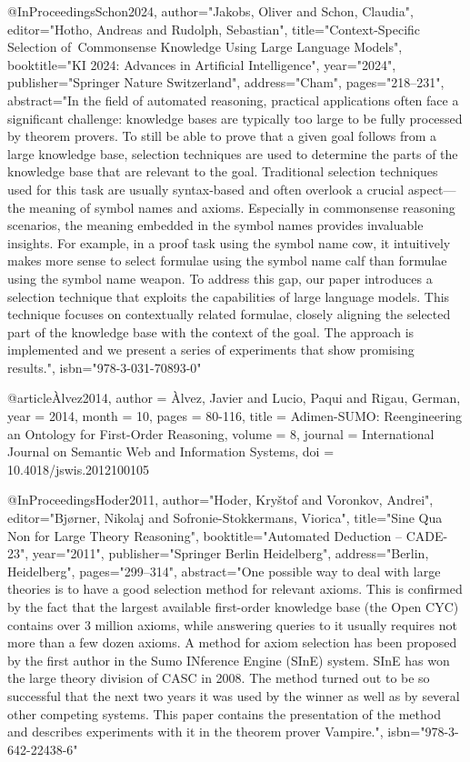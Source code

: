 \documentclass[english,version-2020-11]{uzl-thesis}
\begin{document}
\begin{bibtex-entries}

@InProceedings{Schon2024,
  author="Jakobs, Oliver
  and Schon, Claudia",
  editor="Hotho, Andreas
  and Rudolph, Sebastian",
  title="Context-Specific Selection of Commonsense Knowledge Using Large Language Models",
  booktitle="KI 2024: Advances in Artificial Intelligence",
  year="2024",
  publisher="Springer Nature Switzerland",
  address="Cham",
  pages="218--231",
  abstract="In the field of automated reasoning, practical applications often face a significant challenge: knowledge bases are typically too large to be fully processed by theorem provers. To still be able to prove that a given goal follows from a large knowledge base, selection techniques are used to determine the parts of the knowledge base that are relevant to the goal. Traditional selection techniques used for this task are usually syntax-based and often overlook a crucial aspect---the meaning of symbol names and axioms. Especially in commonsense reasoning scenarios, the meaning embedded in the symbol names provides invaluable insights. For example, in a proof task using the symbol name cow, it intuitively makes more sense to select formulae using the symbol name calf than formulae using the symbol name weapon. To address this gap, our paper introduces a selection technique that exploits the capabilities of large language models. This technique focuses on contextually related formulae, closely aligning the selected part of the knowledge base with the context of the goal. The approach is implemented and we present a series of experiments that show promising results.",
  isbn="978-3-031-70893-0"
}

@article{Àlvez2014,
  author = {Àlvez, Javier and Lucio, Paqui and Rigau, German},
  year = {2014},
  month = {10},
  pages = {80-116},
  title = {Adimen-SUMO: Reengineering an Ontology for First-Order Reasoning},
  volume = {8},
  journal = {International Journal on Semantic Web and Information Systems},
  doi = {10.4018/jswis.2012100105}
}

@InProceedings{Hoder2011,
  author="Hoder, Kry{\v{s}}tof
  and Voronkov, Andrei",
  editor="Bj{\o}rner, Nikolaj
  and Sofronie-Stokkermans, Viorica",
  title="Sine Qua Non for Large Theory Reasoning",
  booktitle="Automated Deduction -- CADE-23",
  year="2011",
  publisher="Springer Berlin Heidelberg",
  address="Berlin, Heidelberg",
  pages="299--314",
  abstract="One possible way to deal with large theories is to have a good selection method for relevant axioms. This is confirmed by the fact that the largest available first-order knowledge base (the Open CYC) contains over 3 million axioms, while answering queries to it usually requires not more than a few dozen axioms. A method for axiom selection has been proposed by the first author in the Sumo INference Engine (SInE) system. SInE has won the large theory division of CASC in 2008. The method turned out to be so successful that the next two years it was used by the winner as well as by several other competing systems. This paper contains the presentation of the method and describes experiments with it in the theorem prover Vampire.",
  isbn="978-3-642-22438-6"
}


\end{bibtex-entries}
\end{document}
